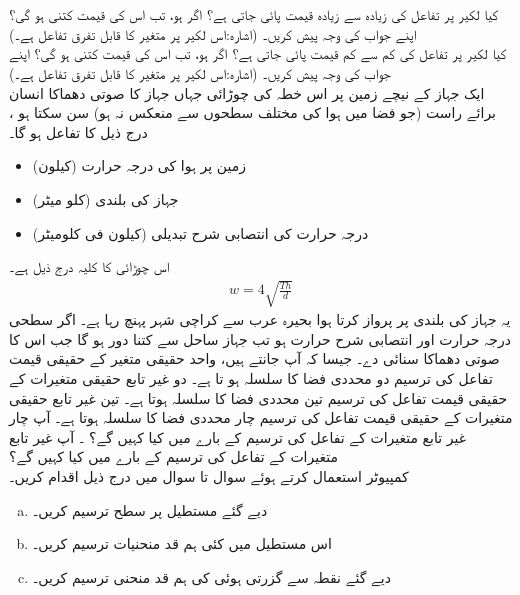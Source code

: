 \\
\\
کیا لکیر  پر تفاعل  کی  زیادہ سے زیادہ قیمت پائی جاتی ہے؟ اگر  ہو، تب اس کی قیمت کتنی ہو گی؟ اپنے جواب کی وجہ پیش کریں۔ (اشارہ:اس لکیر پر  متغیر  کا قابل تفرق تفاعل ہے۔)
\\
کیا لکیر  پر تفاعل  کی کم سے کم  قیمت پائی جاتی ہے؟ اگر  ہو، تب اس کی قیمت کتنی ہو گی؟ اپنے جواب کی وجہ پیش کریں۔ (اشارہ:اس لکیر پر  متغیر  کا قابل تفرق تفاعل ہے۔)
\\
ایک جہاز کے نیچے زمین پر اس خطہ کی چوڑائی   جہاں  جہاز کا   صوتی دھماکا   انسان  برائے راست (جو   فضا میں ہوا کی مختلف  سطحوں سے منعکس نہ ہو)  سن سکتا ہو  ، درج ذیل کا  تفاعل ہو گا۔
\begin{itemize}
\item
{} زمین پر ہوا کی  درجہ حرارت (کیلون) 
\item
{} جہاز کی بلندی (کلو میٹر)
\item
{}  درجہ حرارت کی انتصابی  شرح تبدیلی (کیلون فی کلومیٹر)
\end{itemize}
اس چوڑائی کا  کلیہ درج ذیل ہے۔
\begin{align*}
w=4\sqrt{\tfrac{Th}{d}}
\end{align*}
یہ جہاز  کی بلندی پر پرواز کرتا ہوا  بحیرہ عرب  سے کراچی  شہر    پہنچ رہا ہے۔ اگر سطحی درجہ حرارت  اور انتصابی شرح حرارت  ہو تب   جہاز ساحل سے کتنا دور ہو گا جب اس کا صوتی دھماکا سنائی دے۔
جیسا کہ آپ جانتے ہیں، واحد حقیقی متغیر کے حقیقی قیمت تفاعل کی ترسیم دو محددی فضا کا سلسلہ ہو تا ہے۔ دو غیر تابع حقیقی متغیرات کے حقیقی قیمت تفاعل  کی ترسیم تین محددی فضا کا سلسلہ ہوتا ہے۔    تین غیر تابع حقیقی متغیرات کے حقیقی قیمت تفاعل  کی ترسیم چار  محددی فضا کا سلسلہ ہوتا ہے۔   آپ چار غیر تابع متغیرات کے تفاعل   کی ترسیم کے بارے میں کیا کہیں گے؟ ۔   آپ   غیر تابع متغیرات کے تفاعل   کی ترسیم کے بارے میں کیا کہیں گے؟
\\
کمپیوٹر استعمال کرتے ہوئے سوال  تا سوال  میں درج ذیل اقدام کریں۔
\begin{enumerate}[a.]
\item
دیے گئے مستطیل پر سطح ترسیم کریں۔
\item
اس مستطیل میں کئی ہم قد منحنیات ترسیم کریں۔
\item
دیے گئے نقطہ سے گزرتی  ہوئی    کی   ہم قد منحنی ترسیم کریں۔ 
\end{enumerate}

